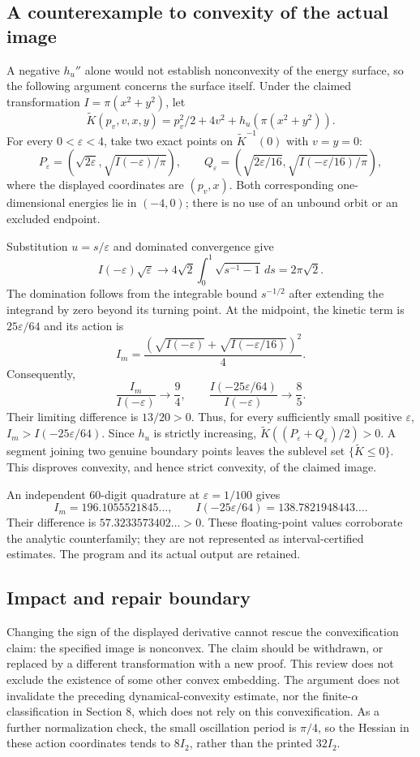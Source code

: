 \documentclass[10pt]{article}
\begin{document}
\subsection*{A counterexample to convexity of the actual image}
A negative \(h_u''\) alone would not establish nonconvexity of the energy surface, so the following argument concerns the surface itself. Under the claimed transformation \(I=\pi(x^2+y^2)\), let \[\widetilde K(p_v,v,x,y)=p_v^2/2+4v^2+h_u(\pi(x^2+y^2)).\] For every \(0<\varepsilon<4\), take two exact points on \(\widetilde K^{-1}(0)\) with \(v=y=0\): \[P_\varepsilon=\left(\sqrt{2\varepsilon},
              \sqrt{I(-\varepsilon)/\pi}\right),\qquad
 Q_\varepsilon=\left(\sqrt{2\varepsilon/16},
              \sqrt{I(-\varepsilon/16)/\pi}\right),\] where the displayed coordinates are \((p_v,x)\). Both corresponding one-dimensional energies lie in \((-4,0)\); there is no use of an unbound orbit or an excluded endpoint.\par
Substitution \(u=s/\varepsilon\) and dominated convergence give \[I(-\varepsilon)\sqrt{\varepsilon}
 \longrightarrow
 4\sqrt2\int_0^1\sqrt{s^{-1}-1}\,ds=2\pi\sqrt2 .\] The domination follows from the integrable bound \(s^{-1/2}\) after extending the integrand by zero beyond its turning point. At the midpoint, the kinetic term is \(25\varepsilon/64\) and its action is \[I_m=\frac{(\sqrt{I(-\varepsilon)}
                 +\sqrt{I(-\varepsilon/16)})^2}{4}.\] Consequently, \[\frac{I_m}{I(-\varepsilon)}\longrightarrow\frac94,\qquad
 \frac{I(-25\varepsilon/64)}{I(-\varepsilon)}
       \longrightarrow\frac85.\] Their limiting difference is \(13/20>0\). Thus, for every sufficiently small positive \(\varepsilon\), \(I_m>I(-25\varepsilon/64)\). Since \(h_u\) is strictly increasing, \(\widetilde K((P_\varepsilon+
Q_\varepsilon)/2)>0\). A segment joining two genuine boundary points leaves the sublevel set \(\{\widetilde K\leq0\}\). This disproves convexity, and hence strict convexity, of the claimed image.\par
An independent 60-digit quadrature at \(\varepsilon=1/100\) gives \[I_m=196.1055521845\ldots,\qquad
 I(-25\varepsilon/64)=138.7821948443\ldots .\] Their difference is \(57.3233573402\ldots>0\). These floating-point values corroborate the analytic counterfamily; they are not represented as interval-certified estimates. The program and its actual output are retained.\par
\subsection*{Impact and repair boundary}
Changing the sign of the displayed derivative cannot rescue the convexification claim: the specified image is nonconvex. The claim should be withdrawn, or replaced by a different transformation with a new proof. This review does not exclude the existence of some other convex embedding. The argument does not invalidate the preceding dynamical-convexity estimate, nor the finite-\(\alpha\) classification in Section 8, which does not rely on this convexification. As a further normalization check, the small oscillation period is \(\pi/4\), so the Hessian in these action coordinates tends to \(8I_2\), rather than the printed \(32I_2\).\par
\end{document}
